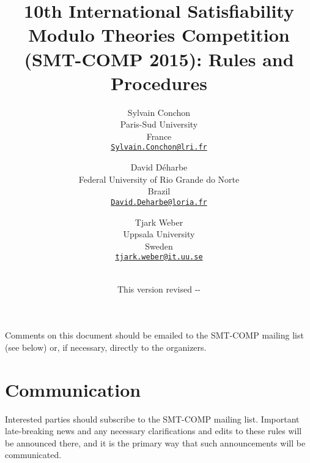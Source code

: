 \documentclass[12pt]{article}
\begin{document}
\date{\small This version revised \the\year-\the\month-\the\day}

\title{10th International Satisfiability Modulo Theories Competition
  (SMT-COMP 2015): Rules and Procedures}

\def\doauthor#1{{%
  \hsize.5\hsize \advance\hsize by-1cm %
  \def\\{\hss\egroup\hbox to\hsize\bgroup\strut\hss}%
  \vbox{\hbox to\hsize\bgroup\strut\hss#1\hss\egroup}}}%

\def\header#1{\medskip\noindent\textbf{#1}}

\author{%
Sylvain Conchon \\
Paris-Sud University \\
France \\
{\small\href{mailto:Sylvain.Conchon@lri.fr}{\tt Sylvain.Conchon@lri.fr}} \\
\and
David D{\'e}harbe \\
Federal University of Rio Grande do Norte \\
Brazil \\
{\small\href{mailto:David.Deharbe@loria.fr}{\tt David.Deharbe@loria.fr}} \\
\and
Tjark Weber \\
Uppsala University \\
Sweden \\
{\small\href{mailto:tjark.weber@it.uu.se}{\tt tjark.weber@it.uu.se}} \\
\\
}

\maketitle

\noindent Comments on this document should be emailed to the SMT-COMP
mailing list (see below) or, if necessary, directly to the organizers.


\section{Communication}

Interested parties should subscribe to the SMT-COMP mailing list.
Important late-breaking news and any necessary clarifications and
edits to these rules will be announced there, and it is the primary
way that such announcements will be communicated.
\end{document}
